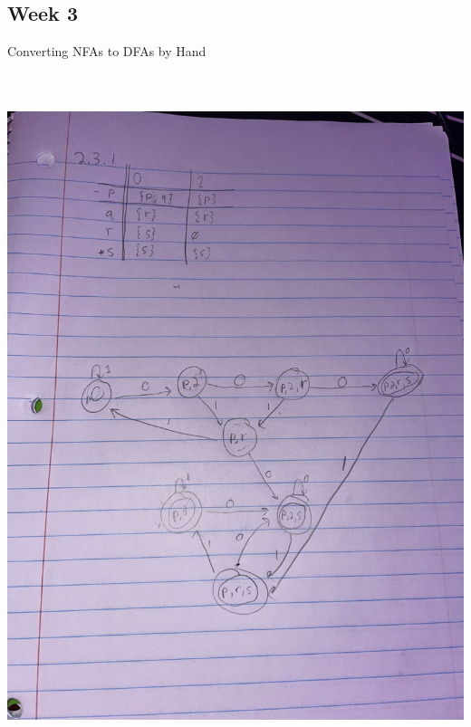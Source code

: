 \documentclass{article}
\theoremstyle{theorem}
\theoremstyle{definition}
\theoremstyle{remark}
\begin{document}
\subsection{Week 3}
Converting NFAs to DFAs by Hand
\medskip\begin{center}
\includegraphics[width=15cm, height=20cm]{Week3.pdf}
\end{center}
\clearpage
\end{document}
